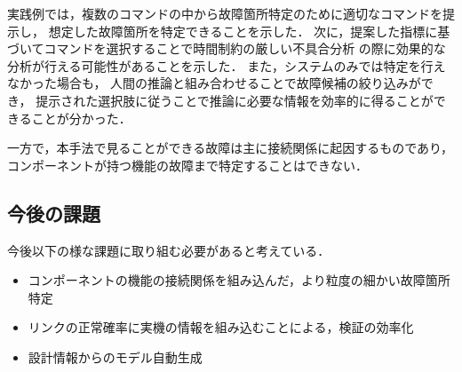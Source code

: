\documentclass[11pt]{jsarticle}%
\begin{document}
\begin{multicols}{2}
実践例では，複数のコマンドの中から故障箇所特定のために適切なコマンドを提示し，
想定した故障箇所を特定できることを示した．
次に，提案した指標に基づいてコマンドを選択することで時間制約の厳しい不具合分析
の際に効果的な分析が行える可能性があることを示した．
また，システムのみでは特定を行えなかった場合も，
人間の推論と組み合わせることで故障候補の絞り込みができ，
提示された選択肢に従うことで推論に必要な情報を効率的に得ることができることが分かった．

一方で，本手法で見ることができる故障は主に接続関係に起因するものであり，
コンポーネントが持つ機能の故障まで特定することはできない．
\vspace{-1zh} 
\subsection{今後の課題}
\vspace{-1zh} 
今後以下の様な課題に取り組む必要があると考えている．
\begin{itemize}
  \item コンポーネントの機能の接続関係を組み込んだ，より粒度の細かい故障箇所特定
  \item リンクの正常確率に実機の情報を組み込むことによる，検証の効率化
  \item 設計情報からのモデル自動生成
\end{itemize}

  
   

\end{multicols}
\end{document}
